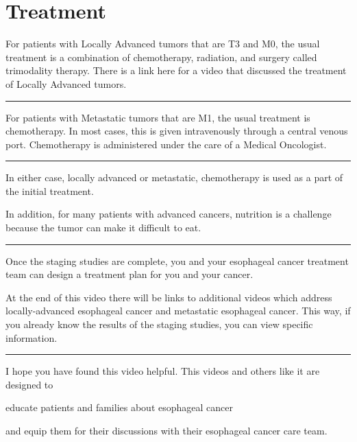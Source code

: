 \documentclass[
]{article}
\begin{document}
\hypertarget{treatment}{%
\section{Treatment}\label{treatment}}

For patients with Locally Advanced tumors that are T3 and M0, the usual
treatment is a combination of chemotherapy, radiation, and surgery
called trimodality therapy. There is a link here for a video that
discussed the treatment of Locally Advanced tumors.

\begin{center}\rule{0.5\linewidth}{0.5pt}\end{center}

For patients with Metastatic tumors that are M1, the usual treatment is
chemotherapy. In most cases, this is given intravenously through a
central venous port. Chemotherapy is administered under the care of a
Medical Oncologist.

\begin{center}\rule{0.5\linewidth}{0.5pt}\end{center}

In either case, locally advanced or metastatic, chemotherapy is used as
a part of the initial treatment.

In addition, for many patients with advanced cancers, nutrition is a
challenge because the tumor can make it difficult to eat.

\begin{center}\rule{0.5\linewidth}{0.5pt}\end{center}

Once the staging studies are complete, you and your esophageal cancer
treatment team can design a treatment plan for you and your cancer.

At the end of this video there will be links to additional videos which
address locally-advanced esophageal cancer and metastatic esophageal
cancer. This way, if you already know the results of the staging
studies, you can view specific information.

\begin{center}\rule{0.5\linewidth}{0.5pt}\end{center}

I hope you have found this video helpful. This videos and others like it
are designed to

educate patients and families about esophageal cancer

and equip them for their discussions with their esophageal cancer care
team.
\end{document}

